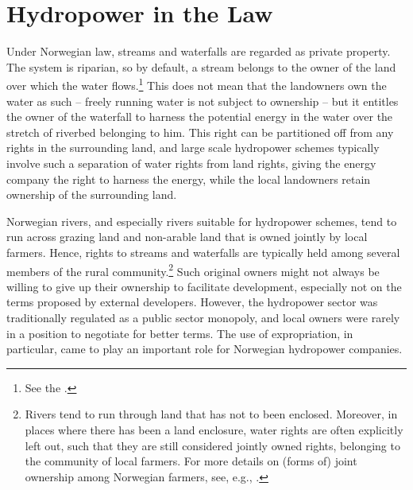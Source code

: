 \section{Hydropower in the Law}\label{sec:hl}

Under Norwegian law, streams and waterfalls are regarded as private property. The system is riparian, so by default, a stream belongs to the owner of the land over which the water flows.\footnote{See the \cite[13]{wra00}.} This does not mean that the landowners own the water as such -- freely running water is not subject to ownership -- but it entitles the owner of the waterfall to harness the potential energy in the water over the stretch of riverbed belonging to him. This right can be partitioned off from any rights in the surrounding land, and large scale hydropower schemes typically involve such a separation of water rights from land rights, giving the energy company the right to harness the energy, while the local landowners retain ownership of the surrounding land.

Norwegian rivers, and especially rivers suitable for hydropower schemes, tend to run across grazing land and non-arable land that is owned jointly by local farmers. Hence, rights to streams and waterfalls are typically held among several members of the rural community.\footnote{Rivers tend to run through land that has not to been enclosed. Moreover, in places where there has been a land enclosure, water rights are often explicitly left out, such that they are still considered jointly owned rights, belonging to the community of local farmers. For more details on (forms of) joint ownership among Norwegian farmers, see, e.g., \cite[570]{stenseth07}.} Such original owners might not always be willing to give up their ownership to facilitate development, especially not on the terms proposed by external developers. However, the hydropower sector was traditionally regulated as a public sector monopoly, and local owners were rarely in a position to negotiate for better terms. The use of expropriation, in particular, came to play an important role for Norwegian hydropower companies.



